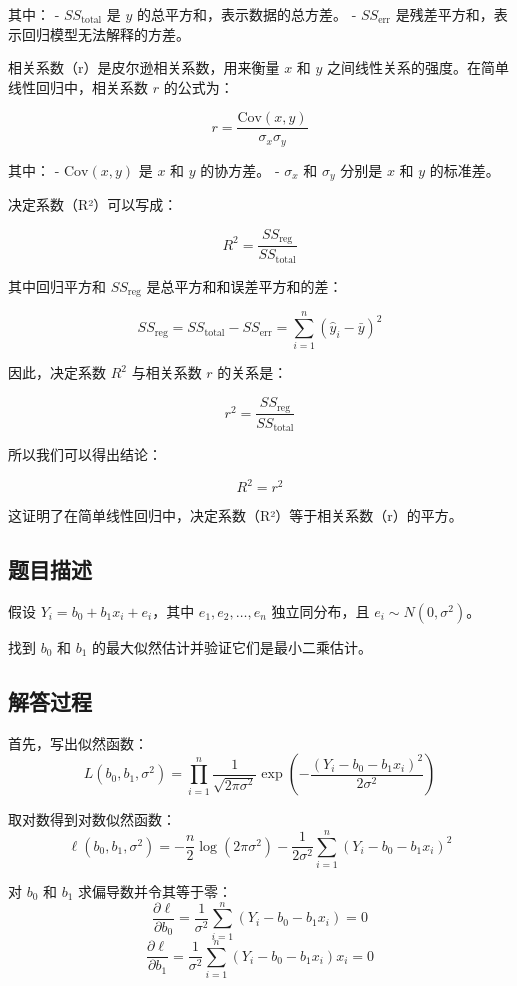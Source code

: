 \documentclass[UTF8]{article}
\theoremstyle{MyLineTheoremStyle} %
\theoremstyle{MyBlockTheoremStyle} %
\theoremstyle{MySubsubsectionStyle} %
\begin{document}
其中：
- \( SS_{\text{total}} \) 是 \( y \) 的总平方和，表示数据的总方差。
- \( SS_{\text{err}} \) 是残差平方和，表示回归模型无法解释的方差。

相关系数（r）是皮尔逊相关系数，用来衡量 \( x \) 和 \( y \) 之间线性关系的强度。在简单线性回归中，相关系数 \( r \) 的公式为：

\[
r = \frac{\text{Cov}(x, y)}{\sigma_x \sigma_y}
\]

其中：
- \( \text{Cov}(x, y) \) 是 \( x \) 和 \( y \) 的协方差。
- \( \sigma_x \) 和 \( \sigma_y \) 分别是 \( x \) 和 \( y \) 的标准差。

决定系数（R²）可以写成：

\[
R^2 = \frac{SS_{\text{reg}}}{SS_{\text{total}}}
\]

其中回归平方和 \( SS_{\text{reg}} \) 是总平方和和误差平方和的差：

\[
SS_{\text{reg}} = SS_{\text{total}} - SS_{\text{err}} = \sum_{i=1}^{n} (\hat{y}_i - \bar{y})^2
\]

因此，决定系数 \( R^2 \) 与相关系数 \( r \) 的关系是：

\[
r^2 = \frac{SS_{\text{reg}}}{SS_{\text{total}}}
\]

所以我们可以得出结论：

\[
R^2 = r^2
\]

这证明了在简单线性回归中，决定系数（R²）等于相关系数（r）的平方。\\

\cleardoublepage

\subsection*{题目描述}
假设 $Y_i = b_0 + b_1 x_i + e_i$，其中 $e_1, e_2, \ldots, e_n$ 独立同分布，且 $e_i \sim N(0, \sigma^2)$。

找到 $b_0$ 和 $b_1$ 的最大似然估计并验证它们是最小二乘估计。

\subsection*{解答过程}

首先，写出似然函数：
\[
L(b_0, b_1, \sigma^2) = \prod_{i=1}^n \frac{1}{\sqrt{2\pi\sigma^2}} \exp\left(-\frac{(Y_i - b_0 - b_1 x_i)^2}{2\sigma^2}\right)
\]

取对数得到对数似然函数：
\[
\ell(b_0, b_1, \sigma^2) = -\frac{n}{2} \log(2\pi\sigma^2) - \frac{1}{2\sigma^2} \sum_{i=1}^n (Y_i - b_0 - b_1 x_i)^2
\]

对 $b_0$ 和 $b_1$ 求偏导数并令其等于零：
\[
\frac{\partial \ell}{\partial b_0} = \frac{1}{\sigma^2} \sum_{i=1}^n (Y_i - b_0 - b_1 x_i) = 0
\]
\[
\frac{\partial \ell}{\partial b_1} = \frac{1}{\sigma^2} \sum_{i=1}^n (Y_i - b_0 - b_1 x_i)x_i = 0
\]
\end{document}
